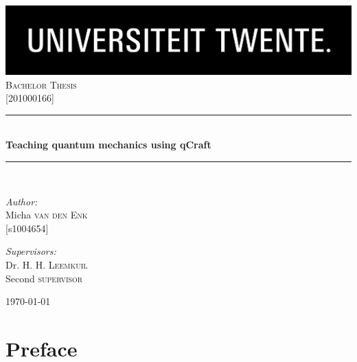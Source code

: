 \documentclass[12pt]{report} %
\newcommand{\HRule}{\rule{\linewidth}{0.5mm}}
\begin{document}
\begin{titlepage}

\begin{center}


\includegraphics[width=1\textwidth]{./logo}\\[1cm]    

\textsc{\Large Bachelor Thesis}\\[0.5cm]
\textsc{\Large {[}201000166{]}}\\[0.5cm]


\HRule \\[0.4cm]
{ \huge \bfseries Teaching quantum mechanics using qCraft}\\[0.4cm]

\HRule \\[1.5cm]

\begin{minipage}{0.4\textwidth}
\begin{flushleft} \large
\emph{Author:}\\
Micha \textsc{van den Enk} \\
{[}s1004654{]} \\
\end{flushleft}
\end{minipage}
\begin{minipage}{0.4\textwidth}
\begin{flushright} \large
\emph{Supervisors:} \\
Dr. H. H. \textsc{Leemkuil} \\
Second \textsc{supervisor} \\
\end{flushright}
\end{minipage}

\vfill

{\large \today}

\end{center}

\end{titlepage}

\setcounter{tocdepth}{1}
\tableofcontents

\chapter{Preface}
\end{document}
